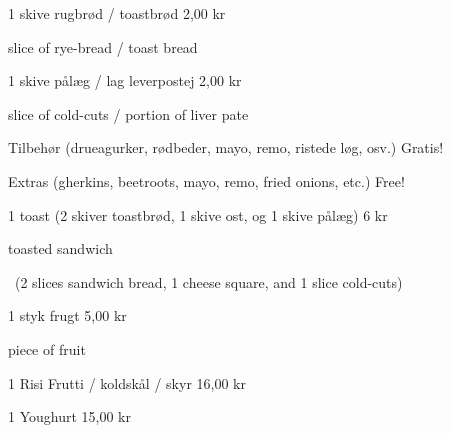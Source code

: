 \documentclass{article}
\begin{document}

\maketitle

\null
\vspace{-0.8cm}


\vspace{0.5cm}

1 skive rugbrød / toastbrød \hfill 2,00 kr

{ slice of rye-bread / toast bread}

\vspace{0.3cm}

1 skive pålæg / lag leverpostej \hfill 2,00 kr

{ slice of cold-cuts / portion of liver pate}

\vspace{0.3cm}

Tilbehør {\large (drueagurker, rødbeder, mayo, remo, ristede løg, osv.)}
\hfill Gratis!

{\english Extras \large (gherkins, beetroots, mayo, remo, fried onions, etc.)}
\hfill  {\english Free!}

\vspace{0.3cm}

1 toast {\large (2 skiver toastbrød, 1 skive ost, og 1 skive pålæg)}
\hfill 6 kr

{ toasted sandwich}
\vspace{-0.1cm}

{\english\large\quad\ (2 slices sandwich bread, 1 cheese square, and 1 slice
cold-cuts)}

\vspace{0.3cm}

1 styk frugt
\hfill 5,00 kr

{ piece of fruit}

\vspace{0.3cm}

1 Risi Frutti / koldskål / skyr
\hfill 16,00 kr

\vspace{0.5cm}

1 Youghurt
\hfill 15,00 kr

\vspace{0.3cm}
\end{document}
